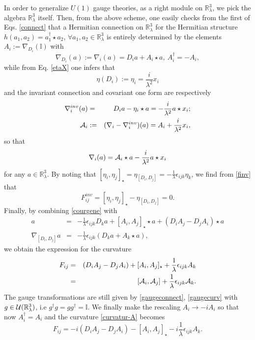 \documentclass[a4paper,11pt]{article}
\numberwithin{equation}{section}
\newcommand\bbbone{\mathbb{I}}
\newcommand\Rl{\mathbb{R}^3_\lambda}
\theoremstyle{nonumberplain}
\begin{document}
In order to generalize $U(1)$ gauge theories, as a right module on $\Rl$, we pick the algebra $\Rl$ itself. Then, from the above scheme, one easily checks from the first of Eqs. \eqref{connect} that a Hermitian connection on $\Rl$ for the Hermitian structure $h(a_1,a_2)=a_1^\dag\star  a_2$, $\forall a_1,a_2\in\Rl$ is entirely determined by the elements $A_i:=\nabla_{D_i}(\bbbone)$ with
\begin{equation}
\nabla_{D_i}(a):=\nabla_i(a)=D_i a+A_i\star  a,\ A_i^\dag=-A_i\label{connectpartic},
\end{equation}
while from Eq. \eqref{etaX} one infers that 
\begin{equation}
\eta(D_i):=\eta_i=\frac{i}{\lambda^2}x_i\label{def-eta}
\end{equation}
and the invariant connection and covariant one form are respectively
\begin{eqnarray}
\nabla^{inv}_{i}(a)&=&D_i a-\eta_i \star a=-\frac{i}{\lambda^2}a\star x_i;\\
{\cal{A}}_i&:=&(\nabla_{i}-\nabla^{inv}_{i})(a)=A_i+\frac{i}{\lambda^2}x_i\label{covarcoord},
\end{eqnarray}
so that
\begin{equation}
\nabla_i(a)={\cal{A}}_i \star a-\frac{i}{\lambda^2}a\star x_i
\end{equation}
for any $a\in\Rl$. By noting that $[\eta_i,\eta_j]_\star=\eta_{[D_i,D_j]}=-\frac{1}{\lambda}\epsilon_{ijk}\eta_k$, we find from \eqref{finv} that
\begin{equation}
F^{inv}_{ij}=[\eta_i,\eta_j]_\star-\eta_{[D_i,D_j]}=0\label{invcurvat}.
\end{equation}
Finally, by combining \eqref{courgene} with
\begin{eqnarray}
[\nabla_i,\nabla_j]a&=&-\frac{1}{\lambda}\epsilon_{ijk}D_k a+[A_i,A_j]_\star \star a+(D_i A_j-D_j A_i)\star a\label{interm1}\\ \nabla_{[D_i,D_j]}a&=&-\frac{1}{\lambda}\epsilon_{ijk}(D_k a+A_k \star a)\label{interm2},
\end{eqnarray}
we obtain the expression for the curvature
\begin{eqnarray}
F_{ij}&=&(D_i A_j-D_j A_i)+[A_i,A_j]_\star+\frac{1}{\lambda}\epsilon_{ijk}A_k\label{curvatur-A}\\
&=&[{\cal{A}}_i,{\cal{A}}_j]+\frac{1}{\lambda}\epsilon_{ijk}{\cal{A}}_k\label{curvatr3l}.
\end{eqnarray}
The gauge transformations are still given by \eqref{gaugeconnect}, \eqref{gaugecurv} with $g\in{\cal{U}}(\Rl)$, i.e $g^\dag g=gg^\dag=\bbbone$. We finally make the rescaling $A_i\to -iA_i$ so that now $A_i^\dag=A_i$ and the curvature \eqref{curvatur-A} becomes 
\begin{equation}
F_{ij}=-i(D_i A_j-D_j A_i)-[A_i,A_j]_\star-i\frac{1}{\lambda}\epsilon_{ijk}A_k\label{praticurvat}.
\end{equation}
\end{document}
